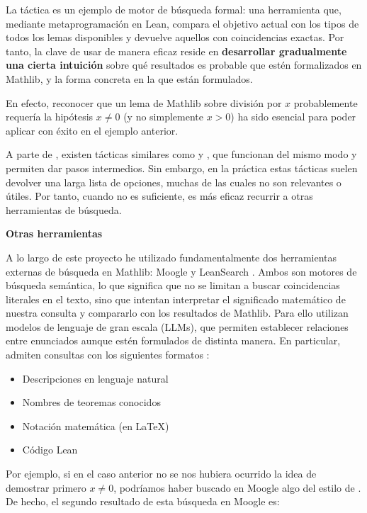 La táctica  es un ejemplo de motor de búsqueda formal: una herramienta que, mediante metaprogramación en Lean, compara el objetivo actual con los tipos de todos los lemas disponibles y devuelve aquellos con coincidencias exactas. Por tanto, la clave de usar  de manera eficaz reside en \textbf{desarrollar gradualmente una cierta intuición} sobre qué resultados es probable que estén formalizados en Mathlib, y la forma concreta en la que están formulados.

En efecto, reconocer que un lema de Mathlib sobre división por $x$ probablemente requería la hipótesis $x\neq0$ (y no simplemente $x>0$) ha sido esencial para poder aplicar  con éxito en el ejemplo anterior.

A parte de , existen tácticas similares como  y , que funcionan del mismo modo y permiten dar pasos intermedios. Sin embargo, en la práctica estas tácticas suelen devolver una larga lista de opciones, muchas de las cuales no son relevantes o útiles. Por tanto, cuando  no es suficiente, es más eficaz recurrir a otras herramientas de búsqueda.

\vspace{1em}
\noindent\textbf{Otras herramientas}

A lo largo de este proyecto he utilizado fundamentalmente dos herramientas externas de búsqueda en Mathlib: Moogle \cite{moogle} y LeanSearch \cite{gao2024semantic}. Ambos son motores de búsqueda semántica, lo que significa que no se limitan a buscar coincidencias literales en el texto, sino que intentan interpretar el significado matemático de nuestra consulta y compararlo con los resultados de Mathlib. Para ello utilizan modelos de lenguaje de gran escala (LLMs), que permiten establecer relaciones entre enunciados aunque estén formulados de distinta manera. En particular, admiten consultas con los siguientes formatos \cite{gao2024semantic}:

\begin{itemize}
  \item Descripciones en lenguaje natural
  \item Nombres de teoremas conocidos
  \item Notación matemática (en LaTeX)
  \item Código Lean
\end{itemize}

Por ejemplo, si en el caso anterior no se nos hubiera ocurrido la idea de demostrar primero $x \neq 0$, podríamos haber buscado en Moogle algo del estilo de \textit{}. De hecho, el segundo resultado de esta búsqueda en Moogle es:

